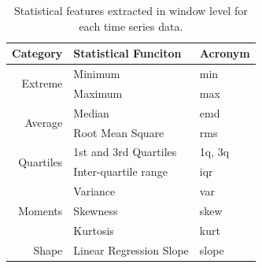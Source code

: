 \begin{table}[h]
\centering
\begin{tabular}{r|l|l}
\hline
Category                   & Statistical Funciton & \multicolumn{1}{l}{Acronym} \\ \hline\hline
\multirow{2}{*}{Extreme}   & Minimum                 & min                          \\ \cline{3-3} 
                           & Maximum                 & max                          \\ \hline
\multirow{2}{*}{Average}   & Median                  & emd                          \\ \cline{3-3} 
                           & Root Mean Square        & rms                          \\ \hline
\multirow{2}{*}{Quartiles} & 1st and 3rd Quartiles   & 1q, 3q                       \\ \cline{3-3} 
                           & Inter-quartile range    & iqr                          \\ \hline
\multirow{3}{*}{Moments}   & Variance                & var                          \\ \cline{3-3} 
                           & Skewness                & skew                         \\ \cline{3-3} 
                           & Kurtosis                & kurt                         \\ \hline
Shape                      & Linear Regression Slope & slope                        \\ \hline
\end{tabular}
\caption{Statistical features extracted in window level for each time series data.}
\label{table:fd}
\end{table}


